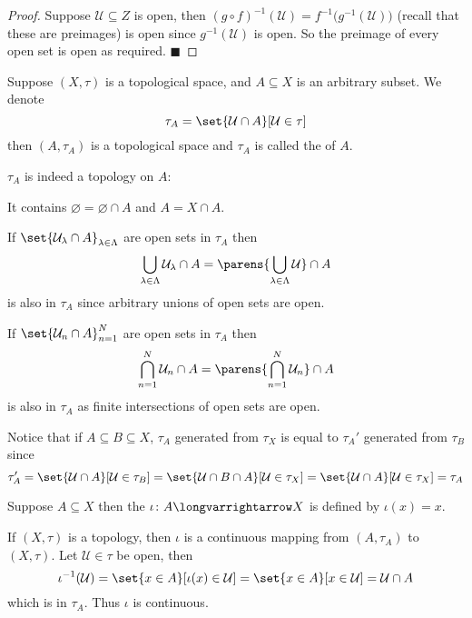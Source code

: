 \documentclass[10pt]{article}
\def\qed{\hskip1cm\penalty-100\hbox{}\hfill$\blacksquare$}
\def\mU{\mathcal{U}}
\def\longto{\longvarrightarrow}
\begin{document}
\begin{proof}

    Suppose $\mU\subseteq Z$ is open, then $(g\circ f)^{-1}(\mU)=f^{-1}\bigl(g^{-1}(\mU)\bigr)$ (recall that these are preimages) is open since $g^{-1}(\mU)$ is open.
    So the preimage of every open set is open as required.
    \qed

\end{proof}

\begin{defn*}

    Suppose $(X,\tau)$ is a topological space, and $A\subseteq X$ is an arbitrary subset.
    We denote
    \[ \tau_A = \set{\mU\cap A}[\mU\in\tau] \]
    then $(A,\tau_A)$ is a topological space and $\tau_A$ is called the  of $A$.

\end{defn*}

$\tau_A$ is indeed a topology on $A$:
\benum
    \item It contains $\varnothing=\varnothing\cap A$ and $A=X\cap A$.
    \item If $\set{\mU_\lambda\cap A}_{\lambda\in\Lambda}$ are open sets in $\tau_A$ then
    \[ \bigcup_{\lambda\in\Lambda}\mU_\lambda\cap A=\parens{\bigcup_{\lambda\in\Lambda}\mU}\cap A \]
    is also in $\tau_A$ since arbitrary unions of open sets are open.
    \item If $\set{\mU_n\cap A}_{n=1}^N$ are open sets in $\tau_A$ then
    \[ \bigcap_{n=1}^N \mU_n\cap A = \parens{\bigcap_{n=1}^N\mU_n}\cap A \]
    is also in $\tau_A$ as finite intersections of open sets are open.
\eenum

Notice that if $A\subseteq B\subseteq X$, $\tau_A$ generated from $\tau_X$ is equal to $\tau_A'$ generated from $\tau_B$ since
\[ \tau_A' = \set{\mU\cap A}[\mU\in\tau_B] = \set{\mU\cap B\cap A}[\mU\in\tau_X] = \set{\mU\cap A}[\mU\in\tau_X] = \tau_A \]

\begin{exam*}

    Suppose $A\subseteq X$ then the  $\iota\colon A\longto X$ is defined by $\iota(x)=x$.

    If $(X,\tau)$ is a topology, then $\iota$ is a continuous mapping from $(A,\tau_A)$ to $(X,\tau)$.
    Let $\mU\in\tau$ be open, then
    \[ \iota^{-1}(\mU)=\set{x\in A}[\iota(x)\in\mU]=\set{x\in A}[x\in\mU]=\mU\cap A \]
    which is in $\tau_A$.
    Thus $\iota$ is continuous.

\end{exam*}
\end{document}
